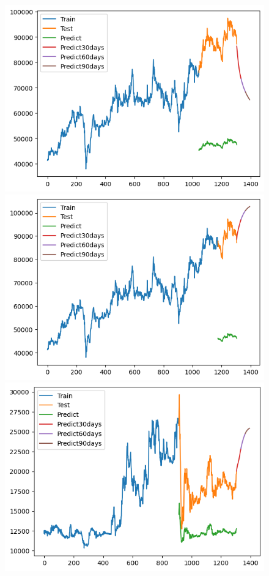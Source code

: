 \begin{figure}[H]
\begin{minipage}{0.15\textwidth}
    \includegraphics[width=1\textwidth]{resources/chapter-5/newdata1/result/VCB_ LSTM_8-2.png}
    \end{minipage}
    \hfill
        \begin{minipage}{0.15\textwidth}
    \centering
    \includegraphics[width=1\textwidth]{resources/chapter-5/newdata1/result/VCB_ LSTM_9-1.png}
    \end{minipage}
    \hfill
    \begin{minipage}{0.15\textwidth}
    \centering
    \includegraphics[width=1\textwidth]{resources/chapter-5/newdata1/result/EIB_ LSTM_7-3.png}

\end{minipage}
\end{figure}
